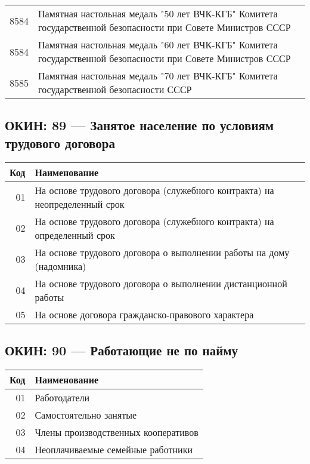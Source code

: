 \documentclass[10pt, a4paper, titlepage]{article}
\begin{document}
\begin{center}
\begin{longtable}{rp{}}
        8584 & Памятная настольная медаль "50 лет ВЧК-КГБ" Комитета государственной безопасности при Совете Министров СССР \\
        8584 & Памятная настольная медаль "60 лет ВЧК-КГБ" Комитета государственной безопасности при Совете Министров СССР \\
        8585 & Памятная настольная медаль "70 лет ВЧК-КГБ" Комитета государственной безопасности СССР \\
    \end{longtable}
\end{center}

\subsection{ОКИН: 89 --- Занятое население по условиям трудового договора}

\begin{center}
    \begin{tabular}{rp{}}
        \hline
        \textbf{Код} & \textbf{Наименование} \\ \hline
        01 & На основе трудового договора (служебного контракта) на неопределенный срок \\
        02 & На основе трудового договора (служебного контракта) на определенный срок \\
        03 & На основе трудового договора о выполнении работы на дому (надомника) \\
        04 & На основе трудового договора о выполнении дистанционной работы \\
        05 & На основе договора гражданско-правового характера \\
    \end{tabular}
\end{center}

\subsection{ОКИН: 90 --- Работающие не по найму}

\begin{center}
    \begin{tabular}{rp{}}
        \hline
        \textbf{Код} & \textbf{Наименование} \\ \hline
        01 & Работодатели \\
        02 & Самостоятельно занятые \\
        03 & Члены производственных кооперативов \\
        04 & Неоплачиваемые семейные работники \\
    \end{tabular}
\end{center}
\end{document}
